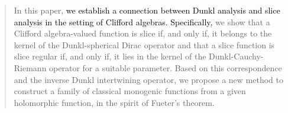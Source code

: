 \documentclass{amsart}
\theoremstyle{definition}
\theoremstyle{remark}
\numberwithin{equation}{section}
\begin{document}
\date{}




\begin{abstract}In this paper, \textcolor{black}{we establish a connection between Dunkl analysis and slice analysis in the setting of Clifford algebras. Specifically,} we show that a Clifford algebra-valued function is slice if, and only if, it belongs to the kernel of the Dunkl-spherical Dirac operator and that a slice function is slice regular if, and only if, it lies in the kernel of the Dunkl-Cauchy-Riemann operator for a suitable parameter. Based on this correspondence and the inverse Dunkl intertwining operator, we propose a new method to construct a family of classical monogenic functions from a given holomorphic function, in the spirit of Fueter’s theorem.
\end{abstract}

\maketitle
\end{document}

